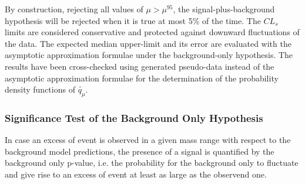 By construction, rejecting all values of $\mu > \mu^{95}$, the signal-plus-background hypothesis will be 
rejected when it is true at most 5\% of the time.
The $CL_{s}$ limits are considered conservative and  protected against downward  fluctuations of the data.
%
%	
%
The expected median upper-limit and its error are evaluated with the asymptotic approximation formulae under the background-only hypothesis.
The results have been cross-checked using generated pseudo-data instead of the asymptotic approximation formulae for the determination
of the  probability density functions of $\tilde{q_{\mu}}$. 


\subsubsection{Significance Test of the Background Only Hypothesis}
In case an excess of event is observed  in a given mass range with respect to the background model predictions,
the presence of a signal is quantified by the background only p-value,
 i.e. the probability for the background only to fluctuate
and give rise to an excess of event at least as large as the observend one.

